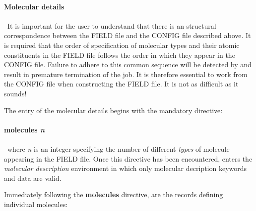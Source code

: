 \paragraph{Molecular details}
\paragraph*{}

\noindent ~It is important for the user to understand that there is an
structural correspondence between the FIELD file and the CONFIG file
described above. It is required that the order of specification of
molecular types and their atomic constituents in the FIELD file follows
the order in which they appear in the CONFIG file. Failure to adhere to
this common sequence will be detected by \D{} and result in premature
termination of the job. It is therefore essential to work from the
CONFIG file when constructing the FIELD file. It is not as difficult as
it sounds!

The entry of the molecular details begins with the mandatory
directive:

\paragraph*{molecules {\em n}}
\paragraph*{}

\noindent
~where {\em n} is an integer specifying the number of different {\em
types} of molecule appearing in the FIELD file. Once this directive
has been encountered, \D{} enters the {\em molecular description}
environment in which only molecular decription keywords and data are
valid.

Immediately following the {\bf molecules} directive, are the records
defining individual molecules:

